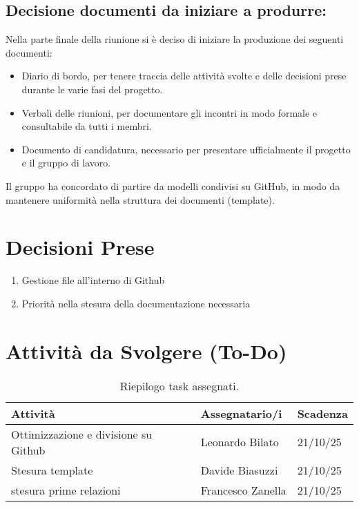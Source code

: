 \documentclass[a4paper, 11pt, oneside]{scrartcl} %
\begin{document}
\subsection{Decisione documenti da iniziare a produrre:}
Nella parte finale della riunione si è deciso di iniziare la produzione dei seguenti documenti:
\begin{itemize}
    \item Diario di bordo, per tenere traccia delle attività svolte e delle decisioni prese durante le varie fasi del progetto.
    \item Verbali delle riunioni, per documentare gli incontri in modo formale e consultabile da tutti i membri.
    \item  Documento di candidatura, necessario per presentare ufficialmente il progetto e il gruppo di lavoro.
\end{itemize}

Il gruppo ha concordato di partire da modelli condivisi su GitHub, in modo da mantenere uniformità nella struttura dei documenti (template).

\newpage
\section{Decisioni Prese}

\begin{enumerate}
    \item Gestione file all'interno di Github
    \item Priorità nella stesura della documentazione necessaria
\end{enumerate}

\newpage
\section{Attività da Svolgere (To-Do)}

\begin{table}[h!]
\centering
\begin{tabular}{@{}lll@{}}
\toprule
\textbf{Attività} & \textbf{Assegnatario/i} & \textbf{Scadenza} \\
\midrule
Ottimizzazione e divisione su Github & Leonardo Bilato & 21/10/25 \\
Stesura template& Davide Biasuzzi & 21/10/25 \\
stesura prime relazioni& Francesco Zanella & 21/10/25 \\
\bottomrule
\end{tabular}
\caption{Riepilogo task assegnati.}
\end{table}
\end{document}
